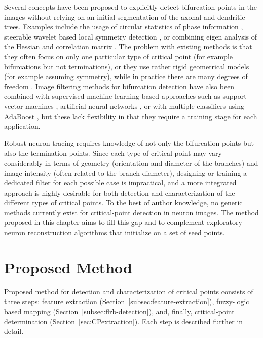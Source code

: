 Several concepts have been proposed to explicitly detect bifurcation points in the images without relying on an initial segmentation of the axonal and dendritic trees. Examples include the usage of circular statistics of phase information \cite{obaraa2012contrast}, steerable wavelet based local symmetry detection \cite{puspoki2013detection}, or combining eigen analysis of the Hessian and correlation matrix \cite{su2012junction}. The problem with existing methods is that they often focus on only one particular type of critical point (for example bifurcations but not terminations), or they use rather rigid geometrical models (for example assuming symmetry), while in practice there are many degrees of freedom \cite{michaelis1994junction}. Image filtering methods for bifurcation detection have also been combined with supervised machine-learning based approaches such as support vector machines \cite{turetken2011automated}, artificial neural networks \cite{bevilacqua2009comparison}, or with multiple classifiers using AdaBoost \cite{zhou2007vascular}, but these lack flexibility in that they require a training stage for each application.

Robust neuron tracing requires knowledge of not only the bifurcation points but also the termination points. Since each type of critical point may vary considerably in terms of geometry (orientation and diameter of the branches) and image intensity (often related to the branch diameter), designing or training a dedicated filter for each possible case is impractical, and a more integrated approach is highly desirable for both detection and characterization of the different types of critical points. To the best of author knowledge, no generic methods currently exist for critical-point detection in neuron images. The method proposed in this chapter aims to fill this gap and to complement exploratory neuron reconstruction algorithms that initialize on a set of seed points.

\section{Proposed Method}
\label{sec:proposed-method}
Proposed method for detection and characterization of critical points consists of three steps: feature extraction (Section~\ref{subsec:feature-extraction}), fuzzy-logic based mapping (Section~\ref{subsec:flrb-detection}), and, finally, critical-point determination (Section~\ref{sec:CPextraction}). Each step is described further in detail. 

